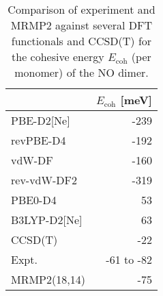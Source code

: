 \begin{table}
\caption{\label{tab:dimer_ecoh}Comparison of experiment and MRMP2 against several DFT functionals and CCSD(T) for the cohesive energy $E_\textrm{coh}$ (per monomer) of the NO dimer.}
\begin{adjustbox}{center}
\begin{tabular}{lr}
\toprule
 & $E_\textrm{coh}$ [meV] \\ 
\midrule
PBE-D2[Ne] & -239 \\
revPBE-D4 & -192 \\
vdW-DF & -160 \\
rev-vdW-DF2 & -319 \\
PBE0-D4 & 53 \\
B3LYP-D2[Ne] & 63 \\
CCSD(T) & -22 \\
Expt. & -61 to -82 \\
MRMP2(18,14) & -75 \\
\bottomrule
\end{tabular}
\end{adjustbox}
\end{table}
